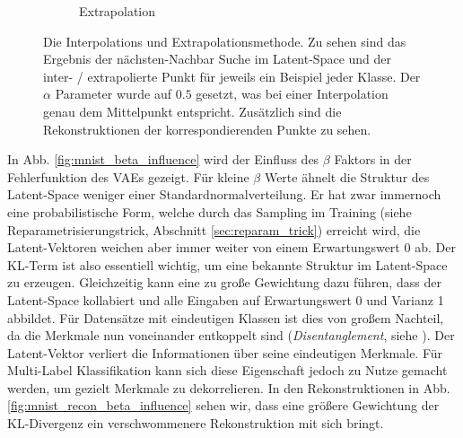 \begin{figure}[hbt]
\begin{subfigure}{.5\textwidth}
  \caption{Extrapolation}
\end{subfigure}
\caption{Die Interpolations und Extrapolationsmethode. Zu sehen sind das Ergebnis der nächsten-Nachbar Suche im Latent-Space und der inter- / extrapolierte Punkt für jeweils ein Beispiel jeder Klasse. Der $\alpha$ Parameter wurde auf $0.5$ gesetzt, was bei einer Interpolation genau dem Mittelpunkt entspricht. Zusätzlich sind die Rekonstruktionen der korrespondierenden Punkte zu sehen.}
\label{fig:extrapolation_feature_space}
\end{figure}

In Abb. \ref{fig:mnist_beta_influence} wird der Einfluss des $\beta$ Faktors in der Fehlerfunktion des VAEs gezeigt. Für kleine $\beta$ Werte  ähnelt die Struktur des Latent-Space weniger einer Standardnormalverteilung. Er hat zwar immernoch eine probabilistische Form, welche durch das Sampling im Training (siehe Reparametrisierungstrick, Abschnitt \ref{sec:reparam_trick}) erreicht wird, die Latent-Vektoren weichen aber immer weiter von einem Erwartungswert 0 ab. Der KL-Term ist also essentiell wichtig, um eine bekannte Struktur im Latent-Space zu erzeugen. Gleichzeitig kann eine zu große Gewichtung dazu führen, dass der Latent-Space kollabiert und alle Eingaben auf Erwartungswert 0 und Varianz 1 abbildet. Für Datensätze mit eindeutigen Klassen ist dies von großem Nachteil, da die Merkmale nun voneinander entkoppelt sind (\textit{Disentanglement}, siehe \cite{Higgins2017}). Der Latent-Vektor verliert die Informationen über seine eindeutigen Merkmale. Für Multi-Label Klassifikation kann sich diese Eigenschaft jedoch zu Nutze gemacht werden, um gezielt Merkmale zu dekorrelieren. In den Rekonstruktionen in Abb. \ref{fig:mnist_recon_beta_influence} sehen wir, dass eine größere Gewichtung der KL-Divergenz ein verschwommenere Rekonstruktion mit sich bringt.

